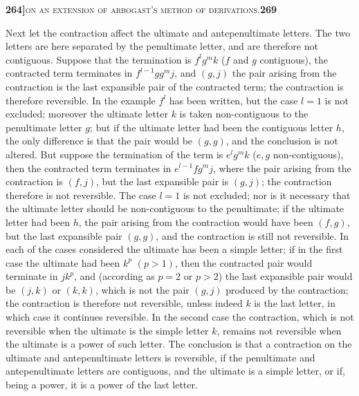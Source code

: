 \documentclass[11pt]{article}
\begin{document}
\newpage
\setcounter{page}{269}

\noindent\textbf{264]}\hfill\textsc{on an extension of arbogast's method of derivations.}\hfill\textbf{269}

\medskip

\noindent Next let the contraction affect the ultimate and antepenultimate letters. The two letters are here separated by the penultimate letter, and are therefore not contiguous. Suppose that the termination is $f^l g^m k$ ($f$ and $g$ contiguous), the contracted term terminates in $f^{l-1} g g^m j$, and $(g, j)$ the pair arising from the contraction is the last expansible pair of the contracted term; the contraction is therefore reversible. In the example $f^l$ has been written, but the case $l = 1$ is not excluded; moreover the ultimate letter $k$ is taken non-contiguous to the penultimate letter $g$; but if the ultimate letter had been the contiguous letter $h$, the only difference is that the pair would be $(g, g)$, and the conclusion is not altered. But suppose the termination of the term is $e^l g^m k$ ($e, g$ non-contiguous), then the contracted term terminates in $e^{l-1} f g^m j$, where the pair arising from the contraction is $(f, j)$, but the last expansible pair is $(g, j)$; the contraction therefore is not reversible. The case $l = 1$ is not excluded; nor is it necessary that the ultimate letter should be non-contiguous to the penultimate; if the ultimate letter had been $h$, the pair arising from the contraction would have been $(f, g)$, but the last expansible pair $(g, g)$, and the contraction is still not reversible. In each of the cases considered the ultimate has been a simple letter; if in the first case the ultimate had been $k^p$ $(p > 1)$, then the contracted pair would terminate in $j k^p$, and (according as $p = 2$ or $p > 2$) the last expansible pair would be $(j, k)$ or $(k, k)$, which is not the pair $(g, j)$ produced by the contraction; the contraction is therefore not reversible, unless indeed $k$ is the last letter, in which case it continues reversible. In the second case the contraction, which is not reversible when the ultimate is the simple letter $k$, remains not reversible when the ultimate is a power of such letter. The conclusion is that a contraction on the ultimate and antepenultimate letters is reversible, if the penultimate and antepenultimate letters are contiguous, and the ultimate is a simple letter, or if, being a power, it is a power of the last letter.

\medskip
\end{document}
